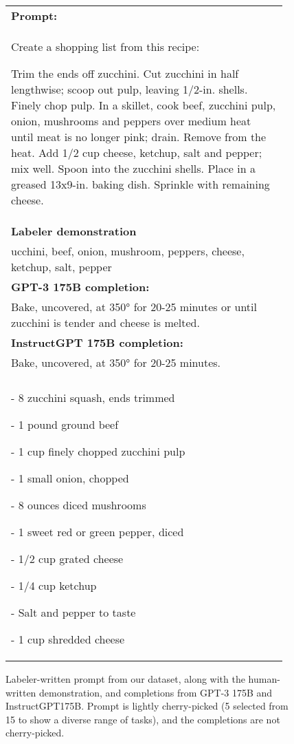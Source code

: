\begin{figure}[hp]
    \centering
    \small
    \begin{tabular}{p{0.95\linewidth}}
    \toprule 
        \textbf{Prompt:}   \\
       Create a shopping list from this recipe: 

Trim the ends off zucchini. Cut zucchini in half lengthwise; scoop out pulp, leaving 1/2-in. shells. Finely chop pulp.
In a skillet, cook beef, zucchini pulp, onion, mushrooms and peppers over medium heat until meat is no longer pink; drain. Remove from the heat. Add 1/2 cup cheese, ketchup, salt and pepper; mix well. Spoon into the zucchini shells. Place in a greased 13x9-in. baking dish. Sprinkle with remaining cheese.

         \\ \midrule
\textbf{Labeler demonstration}\\ 
ucchini, beef, onion, mushroom, peppers, cheese, ketchup, salt, pepper
\\ \midrule 
        \textbf{GPT-3 175B completion:} \\
        Bake, uncovered, at 350° for 20-25 minutes or until zucchini is tender and cheese is melted.

\\ \midrule 
\textbf{InstructGPT 175B completion:} \\
 Bake, uncovered, at 350° for 20-25 minutes.

\\ \\

- 8 zucchini squash, ends trimmed

- 1 pound ground beef

- 1 cup finely chopped zucchini pulp

- 1 small onion, chopped

- 8 ounces diced mushrooms

- 1 sweet red or green pepper, diced

- 1/2 cup grated cheese

- 1/4 cup ketchup

- Salt and pepper to taste

- 1 cup shredded cheese
\\ \bottomrule
    \end{tabular}
    \caption{Labeler-written prompt from our dataset, along with the human-written demonstration, and completions from GPT-3 175B and InstructGPT175B. Prompt is lightly cherry-picked (5 selected from 15 to show a diverse range of tasks), and the completions are not cherry-picked.}
    \label{fig:qual_labeler_4}
\end{figure}



